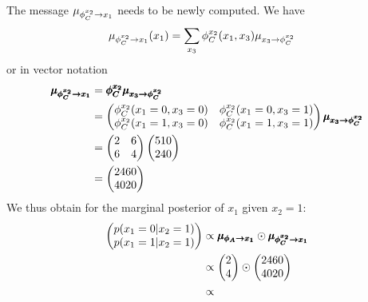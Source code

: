 \begin{exenumerate}
\begin{solution}
    The message $\fxmess{\phi_C^{x_2}}{x_1}{1}$ needs to be newly
    computed. We have
    \begin{align}
      \fxmess{\phi_C^{x_2}}{x_1}{1}(x_1) & = \sum_{x_3} \phi_C^{x_2}(x_1,x_3) \xfmess{x_3}{\phi_C^{x_2}}{1}
    \end{align}
    or in vector notation
    \begin{align}
      \pmb{\mu_{{\phi_C^{x_2}\rightarrow x_1}}} & = \pmb{\phi_C^{x_2}} \pmb{\mu_{{x_3\rightarrow \phi_C^{x_2}}}}\\
      &= \begin{pmatrix}
          \phi_C^{x_2}(x_1=0,x_3=0) &  \phi_C^{x_2}(x_1=0,x_3=1) \\
          \phi_C^{x_2}(x_1=1,x_3=0) & \phi_C^{x_2}(x_1=1,x_3=1)  
        \end{pmatrix}
      \pmb{\mu_{{x_3\rightarrow \phi_C^{x_2}}}}\\
      & = \begin{pmatrix}
        2 & 6 \\
        6 & 4
      \end{pmatrix}
      \begin{pmatrix}
        510\\
        240
      \end{pmatrix}\\
      &=
      \begin{pmatrix}
        2460\\
        4020
      \end{pmatrix}
    \end{align}
    We thus obtain for the marginal posterior of $x_1$ given $x_2=1$:
      \begin{align}
        \begin{pmatrix}
          p(x_1=0 | x_2=1)\\
          p(x_1=1 | x_2=1)
        \end{pmatrix}
        & \propto 
        \fxmessb{\phi_A}{x_1} \odot \fxmessb{\phi^{x_2}_C}{x_1}\\
          & \propto  
          \begin{pmatrix}
            2 \\
            4 \\
          \end{pmatrix}
          \odot
          \begin{pmatrix}
            2460\\
            4020
          \end{pmatrix}\\
          & \propto

\end{align}
\end{solution}
\end{exenumerate}
